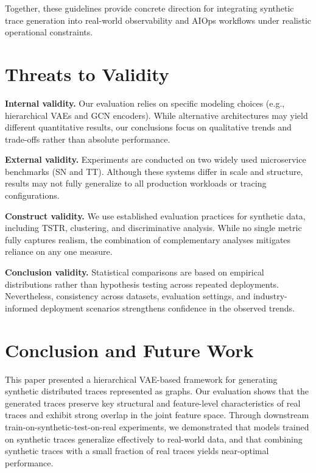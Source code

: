 \documentclass[sigconf,review]{acmart}
\begin{document}
Together, these guidelines provide concrete direction for integrating synthetic trace generation into real-world observability and AIOps workflows under realistic operational constraints.

\section{Threats to Validity}

\textbf{Internal validity.}
Our evaluation relies on specific modeling choices (e.g., hierarchical VAEs and GCN encoders). While alternative architectures may yield different quantitative results, our conclusions focus on qualitative trends and trade-offs rather than absolute performance.

\textbf{External validity.}
Experiments are conducted on two widely used microservice benchmarks (SN and TT). Although these systems differ in scale and structure, results may not fully generalize to all production workloads or tracing configurations.

\textbf{Construct validity.}
We use established evaluation practices for synthetic data, including TSTR, clustering, and discriminative analysis. While no single metric fully captures realism, the combination of complementary analyses mitigates reliance on any one measure.

\textbf{Conclusion validity.}
Statistical comparisons are based on empirical distributions rather than hypothesis testing across repeated deployments. Nevertheless, consistency across datasets, evaluation settings, and industry-informed deployment scenarios strengthens confidence in the observed trends.


\section{Conclusion and Future Work}
\label{sec:conclusion}

This paper presented a hierarchical VAE-based framework for generating synthetic distributed traces represented as graphs. Our evaluation shows that the generated traces preserve key structural and feature-level characteristics of real traces and exhibit strong overlap in the joint feature space. Through downstream train-on-synthetic-test-on-real experiments, we demonstrated that models trained on synthetic traces generalize effectively to real-world data, and that combining synthetic traces with a small fraction of real traces yields near-optimal performance.
\end{document}
